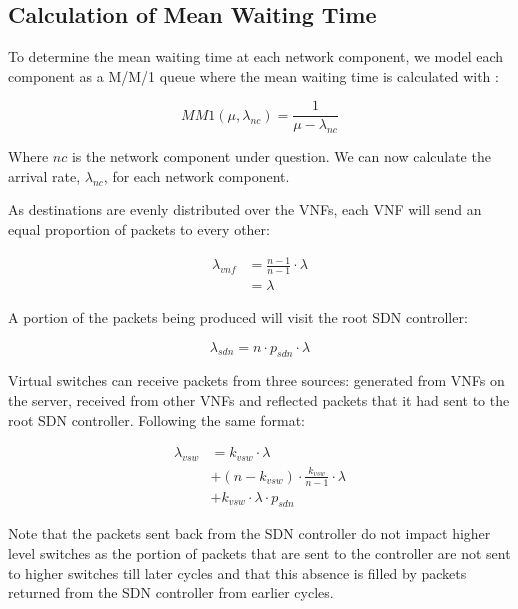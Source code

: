 \subsection{Calculation of Mean Waiting Time}
To determine the mean waiting time at each network component, we model each component as a M/M/1 queue where the mean waiting time is calculated with \cite{Kleinrock75}:

\begin{equation}
\label{eq:MM1_time_in_network}
MM1(\mu, \lambda_{nc}) = \frac{1}{\mu - \lambda_{nc}}
\end{equation}

Where $nc$ is the network component under question. We can now calculate the arrival rate, $\lambda_{nc}$, for each network component.

As destinations are evenly distributed over the VNFs, each VNF will send an equal proportion of packets to every other:

\begin{equation}
\label{eq:arr_vnf}
\begin{split}
\lambda_{vnf} &= \frac{n - 1}{n - 1} \cdot \lambda \\
			  &= \lambda
\end{split}
\end{equation}

A portion of the packets being produced will visit the root SDN controller:

\begin{equation}
\label{eq:arr_sdn}
\lambda_{sdn} = n \cdot p_{sdn} \cdot \lambda
\end{equation}

Virtual switches can receive packets from three sources: generated from VNFs on the server, received from other VNFs and reflected packets that it had sent to the root SDN controller. Following the same format:

\begin{equation}
\label{eq:arr_srv}
\begin{split}
\lambda_{vsw} &= k_{vsw} \cdot \lambda \\
			  &+ (n - k_{vsw}) \cdot  \frac{k_{vsw}}{n - 1} \cdot \lambda \\
			  &+ k_{vsw} \cdot \lambda \cdot p_{sdn}
\end{split}
\end{equation}

Note that the packets sent back from the SDN controller do not impact higher level switches as the portion of packets that are sent to the controller are not sent to higher switches till later cycles and that this absence is filled by packets returned from the SDN controller from earlier cycles. 

